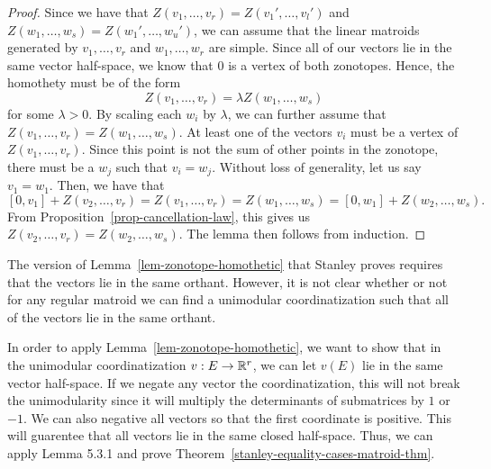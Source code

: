 \documentclass{puthesis-UG}
\begin{document}
\begin{proof}
 	Since we have that $Z(v_1, \ldots, v_r) = Z(v_1', \ldots, v_l')$ and $Z(w_1, \ldots, w_s) = Z(w_1', \ldots, w_u')$, we can assume that the linear matroids generated by $v_1, \ldots, v_r$ and $w_1, \ldots, w_r$ are simple. Since all of our vectors lie in the same vector half-space, we know that $0$ is a vertex of both zonotopes. Hence, the homothety must be of the form 
 	\[
 		Z(v_1, \ldots, v_r) = \lambda Z(w_1, \ldots, w_s)
 	\] 
 	for some $\lambda > 0$. By scaling each $w_i$ by $\lambda$, we can further assume that $Z(v_1, \ldots, v_r) = Z(w_1, \ldots, w_s)$. At least one of the vectors $v_i$ must be a vertex of $Z(v_1, \ldots, v_r)$. Since this point is not the sum of other points in the zonotope, there must be a $w_j$ such that $v_i = w_j$. Without loss of generality, let us say $v_1 = w_1$. Then, we have that 
 	\[
 		[0, v_1] + Z(v_2, \ldots, v_r) = Z(v_1, \ldots, v_r) = Z(w_1, \ldots, w_s) = [0, w_1] +Z(w_2, \ldots, w_s).
 	\]
 	From Proposition~\ref{prop-cancellation-law}, this gives us $Z(v_2, \ldots, v_r) = Z(w_2, \ldots, w_s)$. The lemma then follows from induction.  
\end{proof}

\begin{remark}
	The version of Lemma~\ref{lem-zonotope-homothetic} that Stanley proves requires that the vectors lie in the same orthant. However, it is not clear whether or not for any regular matroid we can find a unimodular coordinatization such that all of the vectors lie in the same orthant. 
\end{remark}

In order to apply Lemma~\ref{lem-zonotope-homothetic}, we want to show that in the unimodular coordinatization $v : E \to \mathbb{R}^r$, we can let $v(E)$ lie in the same vector half-space. If we negate any vector the coordinatization, this will not break the unimodularity since it will multiply the determinants of submatrices by $1$ or $-1$. We can also negative all vectors so that the first coordinate is positive. This will guarentee that all vectors lie in the same closed half-space. Thus, we can apply Lemma 5.3.1 and prove Theorem~\ref{stanley-equality-cases-matroid-thm}. 
\end{document}
